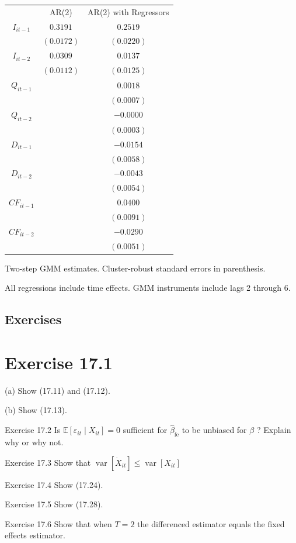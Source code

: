 \documentclass[10pt]{article}
\begin{document}
\begin{tabular}{ccc}
\hline\hline
 & AR(2) & AR(2) with Regressors \\
\cline { 2 - 3 }
$I_{i t-1}$ & $0.3191$ & $0.2519$ \\
 & $(0.0172)$ & $(0.0220)$ \\
$I_{i t-2}$ & $0.0309$ & $0.0137$ \\
 & $(0.0112)$ & $(0.0125)$ \\
$Q_{i t-1}$ &  & $0.0018$ \\
 &  & $(0.0007)$ \\
$Q_{i t-2}$ &  & $-0.0000$ \\
 &  & $(0.0003)$ \\
$D_{i t-1}$ &  & $-0.0154$ \\
 &  & $(0.0058)$ \\
$D_{i t-2}$ &  & $-0.0043$ \\
 &  & $(0.0054)$ \\
$C F_{i t-1}$ &  & $0.0400$ \\
 &  & $(0.0091)$ \\
$C F_{i t-2}$ &  & $-0.0290$ \\
 &  & $(0.0051)$ \\
\hline
\end{tabular}

Two-step GMM estimates. Cluster-robust standard errors in parenthesis.

All regressions include time effects. GMM instruments include lags 2 through 6.

\subsection{Exercises}
\section{Exercise 17.1}
(a) Show (17.11) and (17.12).

(b) Show (17.13).

Exercise 17.2 Is $\mathbb{E}\left[\varepsilon_{i t} \mid X_{i t}\right]=0$ sufficient for $\widehat{\beta}_{\mathrm{fe}}$ to be unbiased for $\beta$ ? Explain why or why not.

Exercise 17.3 Show that $\operatorname{var}\left[\dot{X}_{i t}\right] \leq \operatorname{var}\left[X_{i t}\right]$

Exercise 17.4 Show (17.24).

Exercise 17.5 Show (17.28).

Exercise 17.6 Show that when $T=2$ the differenced estimator equals the fixed effects estimator.
\end{document}
